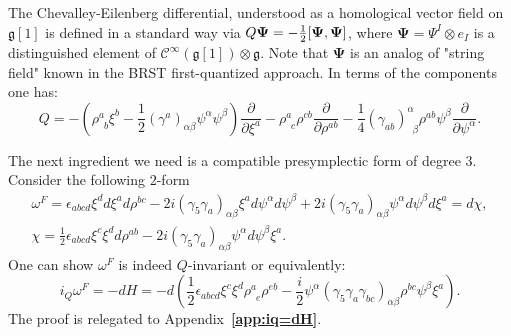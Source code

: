\documentclass[a4paper,12pt]{article}
\numberwithin{equation}{section} %
\newcommand{\bref}[1]{\textbf{\ref{#1}}}
\newcommand{\tensor}{\otimes}
\newcommand{\commut}[2]{[#1{,}\,#2]}
\newcommand{\half}{\mathchoice{%
    \ffrac{1}{2}}{\frac{1}{2}}{\frac{1}{2}}{\frac{1}{2}}}
\newcommand{\ffrac}[2]{\raisebox{.5pt}%
  {\footnotesize$\displaystyle\frac{#1}{#2}$}\kern1pt}
\newcommand{\Liealg}{\mathfrak}
\newcommand{\algg}{\Liealg{g}}
\newcommand{\cC}{\mathcal{C}}
\numberwithin{equation}{section}
\begin{document}
The Chevalley-Eilenberg differential, understood as a homological vector field on $\algg[1]$ is defined in a standard way via $Q\mathbf{\Psi}=-\half\commut{\mathbf{\Psi}}{\mathbf{\Psi}}$, where $\mathbf{\Psi}=\Psi^I \tensor e_I$ is a distinguished element of 
$\cC^\infty(\algg[1])\tensor \algg$. Note that $\mathbf{\Psi}$ is an analog of "string field" known in the BRST first-quantized approach.  In terms of the components one has:
\begin{equation}
    Q = -\left(\rho^a_{\enspace b} \xi^b - \frac{1}{2}(\gamma^a)_{\alpha\beta} \psi^\alpha \psi^\beta \right) \frac{\partial}{\partial \xi^a} - \rho^a_{\enspace c} \rho^{cb} \frac{\partial}{\partial \rho^{ab}} - \frac{1}{4} (\gamma_{ab})^\alpha_{\enspace \beta} \rho^{ab}\psi^\beta \frac{\partial}{\partial \psi^\alpha}.
\end{equation}

The next ingredient we need is a compatible presymplectic form of degree $3$. Consider the following $2$-form
\begin{equation}
    \begin{gathered}
    \label{omega-F}
    \omega^F =  \epsilon_{abcd} \xi^d d\xi^a d\rho^{bc} - 2i (\gamma_5 \gamma_a)_{\alpha\beta}  \xi^a d \psi^\alpha  d \psi^\beta  + 2i (\gamma_5 \gamma_a)_{\alpha\beta} \psi^\alpha d\psi^\beta d\xi^a = d\chi,\\
    \chi = \frac{1}{2}\epsilon_{abcd} \xi^c \xi^d d\rho^{ab} - 2i (\gamma_5 \gamma_a)_{\alpha\beta} \psi^\alpha d\psi^\beta \xi^a.
    \end{gathered}
\end{equation}
One can show $\omega^F$ is indeed $Q$-invariant or equivalently:
\begin{equation}
    i_Q \omega^F =- dH= -d \left(\frac{1}{2}\epsilon_{abcd}\xi^c \xi^d \rho^a_{\enspace e} \rho^{eb} - \frac{i}{2} \psi^\alpha ( \gamma_5 \gamma_a \gamma_{bc})_{\alpha\beta} \rho^{bc} \psi^\beta \xi^a\right).
\end{equation}
The proof is relegated to Appendix~\bref{app:iq=dH}.
\end{document}
